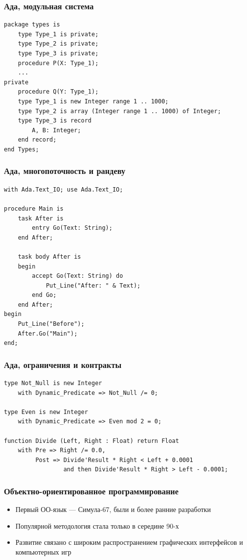 \documentclass{../../slides-style}
\begin{document}
    \begin{frame}[fragile]
        \frametitle{Ада, модульная система}
        \begin{verbatim}
package types is
    type Type_1 is private;
    type Type_2 is private;
    type Type_3 is private;
    procedure P(X: Type_1);
    ...
private
    procedure Q(Y: Type_1);
    type Type_1 is new Integer range 1 .. 1000;
    type Type_2 is array (Integer range 1 .. 1000) of Integer;
    type Type_3 is record
        A, B: Integer;
    end record;
end Types;
        \end{verbatim}
    \end{frame}

    \begin{frame}[fragile]
        \frametitle{Ада, многопоточность и рандеву}
        \begin{small}
            \begin{verbatim}
with Ada.Text_IO; use Ada.Text_IO;

procedure Main is
    task After is
        entry Go(Text: String);
    end After;

    task body After is
    begin
        accept Go(Text: String) do
            Put_Line("After: " & Text);
        end Go;
    end After;
begin
    Put_Line("Before");
    After.Go("Main");
end;
            \end{verbatim}
        \end{small}
    \end{frame}

    \begin{frame}[fragile]
        \frametitle{Ада, ограничения и контракты}
        \begin{verbatim}
type Not_Null is new Integer
    with Dynamic_Predicate => Not_Null /= 0;

type Even is new Integer
    with Dynamic_Predicate => Even mod 2 = 0;

function Divide (Left, Right : Float) return Float
    with Pre => Right /= 0.0,
         Post => Divide'Result * Right < Left + 0.0001
                 and then Divide'Result * Right > Left - 0.0001;
        \end{verbatim}
    \end{frame}

    \begin{frame}
        \frametitle{Объектно-ориентированное программирование}
        \begin{itemize}
            \item Первый ОО-язык --- Симула-67, были и более ранние разработки
            \item Популярной методология стала только в середине 90-х
            \item Развитие связано с широким распространением графических интерфейсов и компьютерных игр
        \end{itemize}
    \end{frame}
\end{document}

